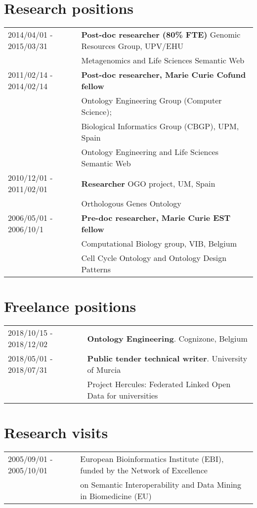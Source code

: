 \documentclass[11pt,fullpage]{article}
\begin{document}
\section*{Research positions}
\begin{tabular}{ll}
2014/04/01 - 2015/03/31 & {\bf Post-doc researcher (80\% FTE)} Genomic Resources Group, UPV/EHU  \\
   & Metagenomics and Life Sciences Semantic Web \\
2011/02/14 - 2014/02/14 & {\bf Post-doc researcher, Marie Curie Cofund fellow} \\
     & Ontology Engineering Group (Computer Science); \\
     & Biological Informatics Group (CBGP), UPM, Spain \\
     & Ontology Engineering and Life Sciences Semantic Web \\
2010/12/01 - 2011/02/01 & {\bf Researcher} OGO project, UM, Spain \\
     & Orthologous Genes Ontology \\
2006/05/01 - 2006/10/1 & {\bf Pre-doc researcher, Marie Curie EST fellow} \\
    & Computational Biology group, VIB, Belgium \\
    & Cell Cycle Ontology and Ontology Design Patterns \\
\end{tabular}

\section*{Freelance positions}
\begin{tabular}{ll}
2018/10/15 - 2018/12/02 & {\bf Ontology Engineering}. Cognizone, Belgium\\
2018/05/01 - 2018/07/31 & {\bf Public tender technical writer}. University of Murcia \\
        &  Project Hercules: Federated Linked Open Data for universities\\
\end{tabular}

\section*{Research visits}

\begin{tabular}{ll}
 2005/09/01 - 2005/10/01 & European Bioinformatics Institute (EBI), funded by the Network of Excellence \\
      & on Semantic Interoperability and Data Mining in Biomedicine (EU)

\end{tabular}
\end{document}

